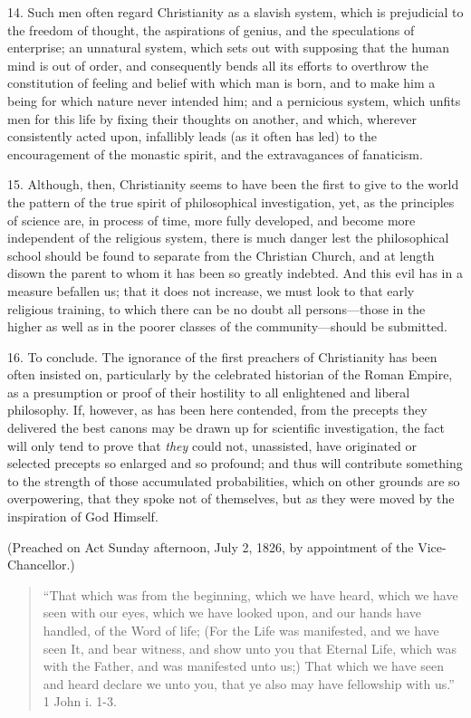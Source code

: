 14. Such men often regard Christianity as a slavish system, which
is prejudicial to the freedom of thought, the aspirations of genius,
and the speculations of enterprise; an unnatural system, which sets
out with supposing that the human mind is out of order, and
consequently bends all its efforts to overthrow the constitution of
feeling and belief with which man is born, and to make him a being for
which nature never intended him; and a pernicious system, which unfits
men for this life by fixing their thoughts on another, and which,
wherever consistently acted upon, infallibly leads (as it often has
led) to the encouragement of the monastic spirit, and the
extravagances of fanaticism.

15. Although, then, Christianity seems to have been the first to
give to the world the pattern of the true spirit of philosophical
investigation, yet, as the principles of science are, in process of
time, more fully developed, and become more independent of the
religious system, there is much danger lest the philosophical school
should be found to separate from the Christian Church, and at length
disown the parent to whom it has been so greatly indebted. And this
evil has in a measure befallen us; that it does not increase, we must
look to that early religious training, to which there can be no doubt
all persons—those in the higher as well as in the poorer classes of
the community—should be submitted.

16. To conclude. The ignorance of the first preachers of
Christianity has been often insisted on, particularly by the
celebrated historian of the Roman Empire, as a presumption or proof of
their hostility to all enlightened and liberal philosophy. If,
however, as has been here contended, from the precepts they delivered
the best canons may be drawn up for scientific investigation, the fact
will only tend to prove that \emph{they} could not, unassisted, have
originated or selected precepts so enlarged and so profound; and thus
will contribute something to the strength of those accumulated
probabilities, which on other grounds are so overpowering, that they
spoke not of themselves, but as they were moved by the inspiration of
God Himself.

(Preached on Act Sunday afternoon, July 2, 1826, by appointment of
the Vice-Chancellor.)


\begin{quote}

``That which was from the beginning, which we have heard,
which we have seen with our eyes, which we have looked upon, and our
hands have handled, of the Word of life; (For the Life was
manifested, and we have seen It, and bear witness, and show unto you
that Eternal Life, which was with the Father, and was manifested
unto us;) That which we have seen and heard declare we unto you,
that ye also may have fellowship with us.'' 1 John i. 1-3.

\end{quote}

